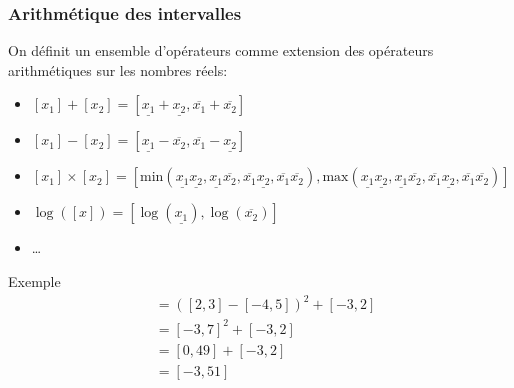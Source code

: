 \documentclass{beamer}
\begin{document}
\begin{frame}
{\begin{figure}[H]
            \caption{}
            \label{fig:fct2}
        \end{figure}
    }

\end{frame}


\begin{frame}
    \frametitle{Arithmétique des intervalles}
    On définit un ensemble d'opérateurs comme extension des opérateurs arithmétiques sur les nombres réels:

    \small
    \begin{itemize}
        \item $[x_1] + [x_2] = [\underline{x_1} + \underline{x_2}, \overline{x_1} + \overline{x_2}]$
        \item $[x_1] - [x_2] = [\underline{x_1} - \overline{x_2}, \overline{x_1} - \underline{x_2}]$
        \item $[x_1] \times [x_2] = [\text{min}(\underline{x_1}\underline{x_2}, \underline{x_1}\overline{x_2}, \overline{x_1}\underline{x_2}, \overline{x_1}\overline{x_2}), \text{max}(\underline{x_1}\underline{x_2}, \underline{x_1}\overline{x_2}, \overline{x_1}\underline{x_2}, \overline{x_1}\overline{x_2})]$
        \item $\log([x]) = [\log(\underline{x_1}), \log(\overline{x_2})]$
        \item \dots
    \end{itemize}

    \begin{block}{Exemple}
        \begin{align}
            [z] &= ([2, 3] - [-4, 5])^2 + [-3, 2] \nonumber \\
                &= [-3,7]^2 + [-3, 2] \nonumber \\
                &= [0, 49] + [-3, 2] \nonumber \\
                &= [-3, 51] \nonumber
        \end{align}
    \end{block}
\end{frame}
\end{document}
